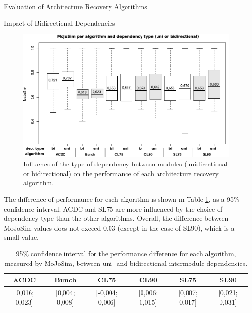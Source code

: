 \documentclass[11pt,twocolumn,a4paper,english]{article}
\begin{document}
\begin{section}{Evaluation of Architecture Recovery Algorithms}
\begin{subsection}{Impact of Bidirectional Dependencies}
	\begin{figure}[htbp]
		\centering
			\includegraphics[scale=1]{figures/exp-dependencies}
		\caption{Influence of the type of dependency between modules (unidirectional or bidirectional) on the performance of each architecture recovery algorithm.}
		\label{fig:exp-dependencies}
	\end{figure}
	
	The difference of performance for each algorithm is shown in Table \ref{tab:exp-dependencies}, as a 95\% confidence interval. ACDC and SL75 are more influenced by the choice of dependency type than the other algorithms. Overall, the difference between MoJoSim values does not exceed 0.03 (except in the case of SL90), which is a small value.
	
	\begin{table}[width=\textwidth]
	  \begin{center}
	  \begin{tabular}{cccccc}
	    \hline
	    \textbf{ACDC} & \textbf{Bunch} & \textbf{CL75} & \textbf{CL90} & \textbf{SL75} & \textbf{SL90} \\
	    \hline
	    \hline
	    \footnotesize{[0,016; 0,023]} & \footnotesize{[0,004; 0,008]} & \footnotesize{[-0,004; 0,006]} & \footnotesize{[0,006; 0,015]} & \footnotesize{[0,007; 0,017]} & \footnotesize{[0,021; 0,031]} \\
	    \hline
	  \end{tabular}
	  \end{center}
	  \caption{95\% confidence interval for the performance difference for each algorithm, measured by MoJoSim, between uni- and bidirectional intermodule dependencies.}
	  \label{tab:exp-dependencies}
	\end{table}

	

\end{subsection}
\end{section}
\end{document}
